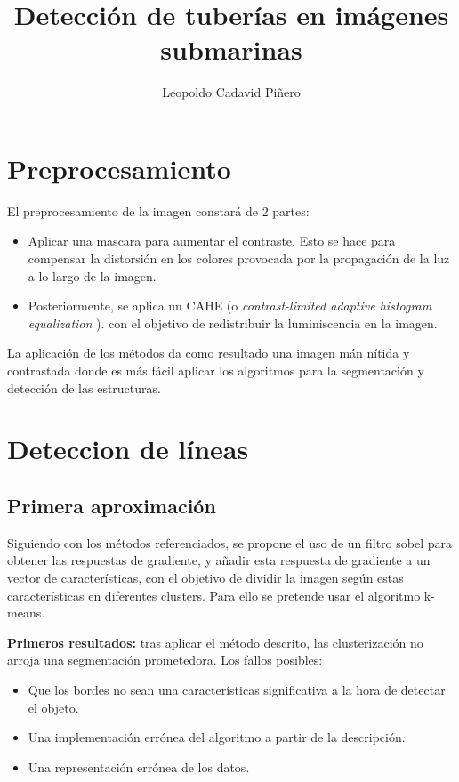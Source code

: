 \documentclass[12pt, a4paper]{article}
\title{Detección de tuberías en imágenes submarinas}
\author{
Leopoldo Cadavid Piñero
}
\begin{document}
\maketitle
\newpage
\tableofcontents
\newpage

      


\section{Preprocesamiento}\label{ch:preprocesamiento}

El preprocesamiento de la imagen constará de 2 partes:

\begin{itemize}
    
    \item Aplicar una mascara para aumentar el contraste. Esto se hace para compensar
    la distorsión en los colores provocada por la propagación de la luz a lo largo de la imagen.
    


    \item Posteriormente, se aplica un CAHE (o \textit{contrast-limited adaptive histogram equalization} ).
    con el objetivo de redistribuir la luminiscencia en la imagen. 
    
    

\end{itemize}

La aplicación de los métodos da como resultado una imagen mán nítida y contrastada
 donde es más fácil aplicar los algoritmos para la segmentación y detección de las estructuras.


\section{Deteccion de líneas}

\subsection{Primera aproximación}

Siguiendo con los métodos referenciados, se propone el uso de un filtro sobel para obtener
las respuestas de gradiente, y añadir esta respuesta de gradiente a un vector de características,
con el objetivo de dividir la imagen según estas características en diferentes clusters. Para ello se pretende usar el algoritmo
k-means. 

\textbf{Primeros resultados:} tras aplicar el método descrito, las clusterización no arroja una segmentación prometedora.
Los fallos posibles:
\begin{itemize}
    \item Que los bordes no sean una características significativa a la hora de detectar
    el objeto. 

    \item Una implementación errónea del algoritmo a partir de la descripción. 
    \item Una representación errónea de los datos.
\end{itemize}
\end{document}
